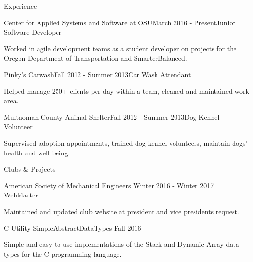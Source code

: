 \documentclass{resume} %
\begin{document}

\begin{rSection}{Experience}

  \begin{rSubsection}{Center for Applied Systems and Software at OSU}{March 2016 - Present}{Junior Software Developer}{}
  \item Worked in agile development teams as a student developer on projects for the Oregon  Department of Transportation and SmarterBalanced.
  \end{rSubsection}

  \begin{rSubsection}{Pinky’s Carwash}{Fall 2012 - Summer 2013}{Car Wash Attendant}{}
  \item Helped manage 250+ clients per day within a team, cleaned and maintained work area.
  \end{rSubsection}
  
  \begin{rSubsection}{Multnomah County Animal Shelter}{Fall 2012 - Summer 2013}{Dog Kennel Volunteer}{}
  \item Supervised adoption appointments, trained dog kennel volunteers, maintain dogs’ health and well being. 
  \end{rSubsection}

\end{rSection}


\begin{rSection}{Clubs \& Projects}
	\begin{rSubsection} {American Society of Mechanical Engineers} {Winter 2016 - Winter 2017} {WebMaster} {}
	\item Maintained and updated club website at president and vice presidents request.
	\end{rSubsection}
    
    \begin{rSubsection} {C-Utility-SimpleAbstractDataTypes} {Fall 2016} {} {}
    \item Simple and easy to use implementations of the Stack and Dynamic Array data types for the C programming language.
    \end{rSubsection}


\end{rSection}
\end{document}

